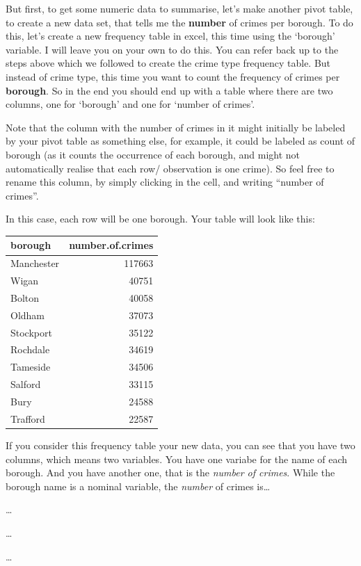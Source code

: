 \documentclass[
]{book}
\begin{document}
But first, to get some numeric data to summarise, let's make another pivot table, to create a new data set, that tells me the \textbf{number} of crimes per borough. To do this, let's create a new frequency table in excel, this time using the `borough' variable. I will leave you on your own to do this. You can refer back up to the steps above which we followed to create the crime type frequency table. But instead of crime type, this time you want to count the frequency of crimes per \textbf{borough}. So in the end you should end up with a table where there are two columns, one for `borough' and one for `number of crimes'.

Note that the column with the number of crimes in it might initially be labeled by your pivot table as something else, for example, it could be labeled as count of borough (as it counts the occurrence of each borough, and might not automatically realise that each row/ observation is one crime). So feel free to rename this column, by simply clicking in the cell, and writing ``number of crimes''.

In this case, each row will be one borough. Your table will look like this:

\begin{tabular}{l|r}
\hline
borough & number.of.crimes\\
\hline
Manchester & 117663\\
\hline
Wigan & 40751\\
\hline
Bolton & 40058\\
\hline
Oldham & 37073\\
\hline
Stockport & 35122\\
\hline
Rochdale & 34619\\
\hline
Tameside & 34506\\
\hline
Salford & 33115\\
\hline
Bury & 24588\\
\hline
Trafford & 22587\\
\hline
\end{tabular}

If you consider this frequency table your new data, you can see that you have two columns, which means two variables. You have one variabe for the name of each borough. And you have another one, that is the \emph{number of crimes}. While the borough name is a nominal variable, the \emph{number} of crimes is\ldots{}

\ldots{}

\ldots{}

\ldots{}
\end{document}
